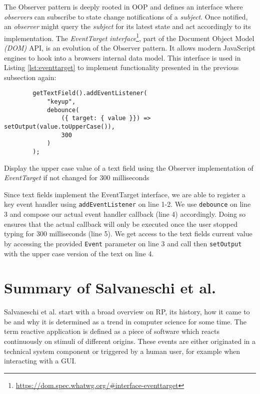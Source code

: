 \documentclass[12pt,a4paper]{article}
\begin{document}
The Observer pattern \cite{gamma1995design} is deeply rooted in OOP and defines an interface where \emph{observers} can subscribe to state change notifications of a \emph{subject}. Once notified, an \emph{observer} might query the \emph{subject} for its latest state and act accordingly to its implementation. The \emph{EventTarget interface}\footnote{\url{https://dom.spec.whatwg.org/\#interface-eventtarget}}, part of the Document Object Model \emph{(DOM)} API, is an evolution of the Observer pattern. It allows modern JavaScript engines to hook into a browsers internal data model. This interface is used in Listing \ref{lst:eventtarget} to implement functionality presented in the previous subsection again:

\begin{listing}[H]
	\begin{verbatim}
		getTextField().addEventListener(
			"keyup",
			debounce(
				({ target: { value }}) => setOutput(value.toUpperCase()),
				300
			)
		);
	\end{verbatim}
	\caption{Display the upper case value of a text field using the Observer implementation of \emph{EventTarget} if not changed for 300 milliseconds}
	\label{lst:eventtarget}
\end{listing}

Since text fields implement the EventTarget interface, we are able to register a key event handler using \texttt{addEventListener} on line 1-2. We use \texttt{debounce} on line 3 and compose our actual event handler callback (line 4) accordingly. Doing so ensures that the actual callback will only be executed once the user stopped typing for 300 milliseconds (line 5). We get access to the text fields current value by accessing the provided \texttt{Event} parameter on line 3 and call then \texttt{setOutput} with the upper case version of the text on line 4.

\section{Summary of Salvaneschi et al.}
\label{sec:summary}

Salvaneschi et al. start with a broad overview on RP, its history, how it came to be and why it is determined as a trend in computer science for some time. The term reactive application is defined as a piece of software which reacts continuously on stimuli of different origins. These events are either originated in a technical system component or triggered by a human user, for example when interacting with a GUI.
\end{document}
